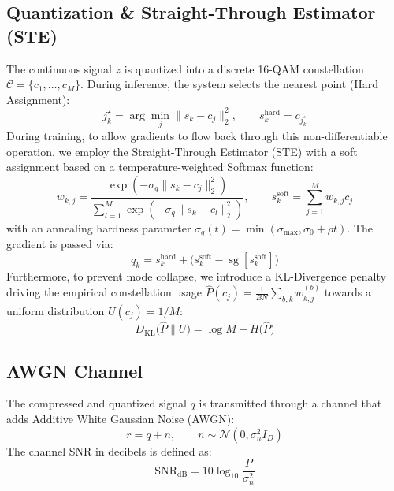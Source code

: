 \documentclass[a4paper,11pt]{article}
\begin{document}
\subsection{Quantization \& Straight-Through Estimator (STE)}
The continuous signal $z$ is quantized into a discrete 16-QAM constellation $\mathcal{C} = \{c_1, \dots, c_M\}$. During inference, the system selects the nearest point (Hard Assignment):
\begin{equation}
j_k^{\star} = \arg\min_{j} \lVert s_k - c_j \rVert_2^2, \qquad s_k^{\text{hard}} = c_{j_k^{\star}}
\end{equation}
During training, to allow gradients to flow back through this non-differentiable operation, we employ the Straight-Through Estimator (STE) with a soft assignment based on a temperature-weighted Softmax function:
\begin{equation}
w_{k,j} = \frac{\exp(-\sigma_q \lVert s_k - c_j \rVert_2^2)}{\sum_{l=1}^{M}\exp(-\sigma_q \lVert s_k - c_l \rVert_2^2)}, \qquad s_k^{\text{soft}} = \sum_{j=1}^{M} w_{k,j} c_j
\end{equation}
with an annealing hardness parameter $\sigma_q(t) = \min(\sigma_{\max}, \sigma_0 + \rho t)$. The gradient is passed via:
\begin{equation}
q_k = s_k^{\text{hard}} + \big(s_k^{\text{soft}} - \operatorname{sg}[s_k^{\text{soft}}]\big)
\end{equation}
Furthermore, to prevent mode collapse, we introduce a KL-Divergence penalty driving the empirical constellation usage $\hat{P}(c_j) = \frac{1}{B N} \sum_{b,k} w_{k,j}^{(b)}$ towards a uniform distribution $U(c_j) = 1/M$:
\begin{equation}
D_{\mathrm{KL}}\big(\hat P \| U\big) = \log M - H\big(\hat P\big)
\end{equation}

\subsection{AWGN Channel}
The compressed and quantized signal $q$ is transmitted through a channel that adds Additive White Gaussian Noise (AWGN):
\begin{equation}
r = q + n, \qquad n \sim \mathcal{N}(0, \sigma_n^2 I_D)
\end{equation}
The channel SNR in decibels is defined as:
\begin{equation}
\mathrm{SNR_{dB}} = 10 \log_{10}\frac{P}{\sigma_n^2}
\end{equation}
\end{document}
